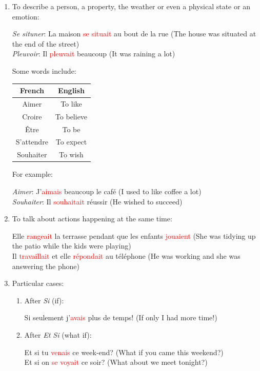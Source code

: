 \documentclass{book}
\begin{document}
\begin{enumerate}
    \item To describe a person, a property, the weather or even a physical state or an emotion:
    \begin{center}
        \textit{Se situner}: La maison \textcolor{red}{se situait} au bout de la rue (The house was situated at the end of the street) \\
        \textit{Pleuvoir}: Il \textcolor{red}{pleuvait} beaucoup (It was raining a lot)
    \end{center}
    Some words include:
    \begin{center}
        \begin{tabular}{|c|c|}
            \hline
            \textbf{French} & \textbf{English} \\
            \hline
            Aimer & To like \\
            \hline
            Croire & To believe \\
            \hline
            Être & To be \\
            \hline
            S'attendre & To expect \\
            \hline
            Souhaiter & To wish \\
            \hline
        \end{tabular}
    \end{center}
    For example:
    \begin{center}
        \textit{Aimer}: J'\textcolor{red}{aimais} beaucoup le café (I used to like coffee a lot) \\
        \textit{Souhaiter}: Il \textcolor{red}{souhaitait} réussir (He wished to succeed)
    \end{center}

    \item To talk about actions happening at the same time:
    \begin{center}
        Elle \textcolor{red}{rangeait} la terrasse pendant que les enfants \textcolor{red}{jouaient} (She was tidying up the patio while the kids were playing) \\
        Il \textcolor{red}{travaillait} et elle \textcolor{red}{répondait} au téléphone (He was working and she was answering the phone)
    \end{center}

    \item Particular cases:
    \begin{enumerate}
        \item After \textit{Si} (if):
        \begin{center}
            Si seulement j'\textcolor{red}{avais} plus de temps! (If only I had more time!)
        \end{center}
        \item After \textit{Et Si} (what if):
        \begin{center}
            Et si tu \textcolor{red}{venais} ce week-end? (What if you came this weekend?) \\
            Et si on \textcolor{red}{se voyait} ce soir? (What about we meet tonight?)
        \end{center}
    \end{enumerate}


\end{enumerate}
\end{document}
